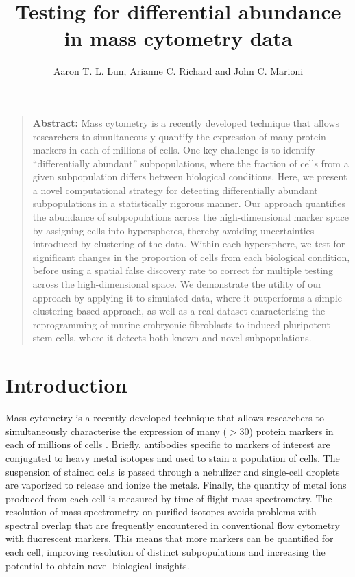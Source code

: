 \documentclass{article}
\title{Testing for differential abundance in mass cytometry data}
\author{Aaron T. L. Lun, Arianne C. Richard and John C. Marioni}
\begin{document}
\maketitle

\begin{quote}
\textbf{Abstract:} Mass cytometry is a recently developed technique that allows researchers to simultaneously quantify the expression of many protein markers in each of millions of cells. 
One key challenge is to identify ``differentially abundant'' subpopulations, where the fraction of cells from a given subpopulation differs between biological conditions. 
Here, we present a novel computational strategy for detecting differentially abundant subpopulations in a statistically rigorous manner. 
Our approach quantifies the abundance of subpopulations across the high-dimensional marker space by assigning cells into hyperspheres, thereby avoiding uncertainties introduced by clustering of the data. 
Within each hypersphere, we test for significant changes in the proportion of cells from each biological condition, before using a spatial false discovery rate to correct for multiple testing across the high-dimensional space. 
We demonstrate the utility of our approach by applying it to simulated data, where it outperforms a simple clustering-based approach, as well as a real dataset characterising the reprogramming of murine embryonic fibroblasts to induced pluripotent stem cells, where it detects both known and novel subpopulations.
\end{quote}

\section{Introduction}
Mass cytometry is a recently developed technique that allows researchers to simultaneously characterise the expression of many ($>30$) protein markers in each of millions of cells \cite{ornatsky2008study}.
Briefly, antibodies specific to markers of interest are conjugated to heavy metal isotopes and used to stain a population of cells.
The suspension of stained cells is passed through a nebulizer and single-cell droplets are vaporized to release and ionize the metals.
Finally, the quantity of metal ions produced from each cell is measured by time-of-flight mass spectrometry.
The resolution of mass spectrometry on purified isotopes avoids problems with spectral overlap that are frequently encountered in conventional flow cytometry with fluorescent markers.
This means that more markers can be quantified for each cell, improving resolution of distinct subpopulations and increasing the potential to obtain novel biological insights.
\end{document}
